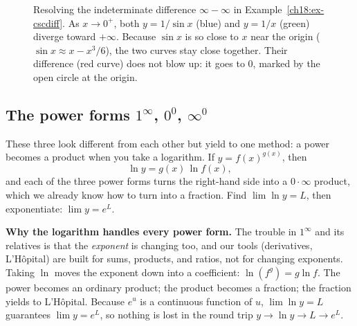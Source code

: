 \begin{figure}[H]
\centering
{}
\caption{Resolving the indeterminate difference $\infty - \infty$ in Example~\ref{ch18:ex-cscdiff}.
As $x \to 0^+$, both $y = 1/\sin x$ (blue) and $y = 1/x$ (green) diverge toward $+\infty$.
Because $\sin x$ is so close to $x$ near the origin ($\sin x \approx x - x^3/6$), the
two curves stay close together. Their difference (red curve)
does not blow up: it goes to $0$, marked by the open circle at the
origin.}
\label{ch18:fig-cscdiff}
\end{figure}

\subsection{The power forms $1^{\infty}$, $0^{0}$, $\infty^{0}$}

These three look different from each other but yield to one method: a power
becomes a product when you take a logarithm. If $y=f(x)^{g(x)}$, then
\[
\ln y=g(x)\,\ln f(x),
\]
and each of the three power forms turns the right-hand side into a $0\cdot\infty$
product, which we already know how to turn into a fraction. Find $\lim \ln y=L$, then
exponentiate: $\lim y=e^{L}$.

\begin{whybox}
\textbf{Why the logarithm handles every power form.} The trouble in $1^\infty$ and its
relatives is that the \emph{exponent} is changing too, and our tools (derivatives,
L'H\^opital) are built for sums, products, and ratios, not for changing exponents.
Taking $\ln$ moves the exponent down into a
coefficient: $\ln(f^{g})=g\ln f$. The power becomes an ordinary
product; the product becomes a fraction; the fraction yields to L'H\^opital. Because
$e^u$ is a continuous function of $u$, $\lim \ln y=L$ guarantees $\lim y=e^{L}$, so
nothing is lost in the round trip $y\to\ln y\to L\to e^L$.
\end{whybox}

